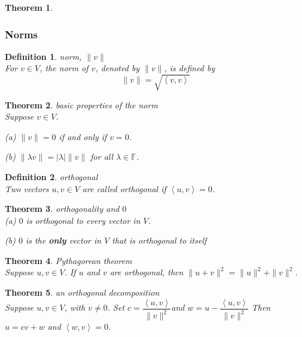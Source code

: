\documentclass{article}
\newtheorem{theorem}{Theorem}[subsection]
\newtheorem{definition}{Definition}[subsection]
\newcommand{\FF}{\mathbb{F}}
\begin{document}
\begin{CJK}{UTF8}{gkai}
\begin{theorem}
\end{theorem}
\subsubsection{Norms}

\begin{definition}
    norm, $\|v\|$\\

    For $v \in V$, the norm of $v$, denoted by $\|v\|$, is defined by
    \[\|v\| = \sqrt{\left<v,v\right>}\]
\end{definition}

\begin{theorem}
    basic properties of the norm\\

    Suppose $v \in V$.

    (a) $\|v\| = 0$ if and only if $v = 0$.

    (b) $\|\lambda v\| = |\lambda|\|v\|$ for all $\lambda \in \FF$.
\end{theorem}

\begin{definition}
    orthogonal\\

    Two vectors $u,v \in V$ are called orthogonal if $\left<u,v\right> = 0$.
\end{definition}

\begin{theorem}
    orthogonality and $0$\\

    (a) $0$ is orthogonal to every vector in $V$.

    (b) $0$ is the \textbf{only} vector in $V$ that is orthogonal to itself
\end{theorem}

\begin{theorem}
    Pythagorean theorem\\

    Suppose $u,v \in V$. If $u$ and $v$ are orthogonal, then $\|u +v\|^2 = \|u\|^2 +\|v\|^2$.
\end{theorem}

\begin{theorem}
    an orthogonal decomposition\\

    Suppose $u,v \in V$, with $v \neq 0$. Set $c = \dfrac{\left<u,v\right>}{\|v\|^2}$and $w = u -  \dfrac{\left<u,v\right>}{\|v\|^2}$ Then $u =cv+w$ and $\left<w,v\right>=0$.
\end{theorem}


\end{CJK}
\end{document}
